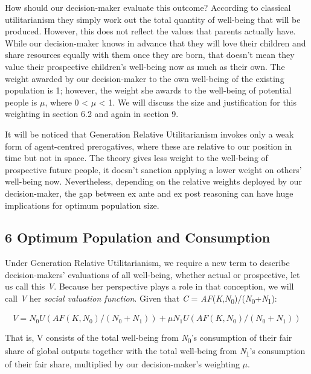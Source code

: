 \documentclass[man,11pt,a4paper,floatsintext]{apa7}
\begin{document}
How should our decision-maker evaluate this outcome? According to classical utilitarianism they simply work out the total quantity of well-being that will be produced. However, this does not reflect the values that parents actually have. While our decision-maker knows in advance that they will love their children and share resources equally with them once they are born, that doesn't mean they value their prospective children's well-being now as much as their own. The weight awarded by our decision-maker to the own well-being of the existing population is 1; however, the weight she awards to the well-being of potential people is $\mu$, where 0 \textless{} $\mu$ \textless{} 1. We will discuss the size and justification for this weighting in section 6.2 and again in section 9.

It will be noticed that Generation Relative Utilitarianism invokes only a weak form of agent-centred prerogatives, where these are relative to our position in time but not in space. The theory gives less weight to the well-being of prospective future people, it doesn't sanction applying a lower weight on others' well-being now. Nevertheless, depending on the relative weights deployed by our decision-maker, the gap between ex ante and ex post reasoning can have huge implications for optimum population size.

\subsection{6 Optimum Population and Consumption}

Under Generation Relative Utilitarianism, we require a new term to describe decision-makers' evaluations of all well-being, whether actual or prospective, let us call this \textit{V}. Because her perspective plays a role in that conception, we will call \textit{V} her \textit{social valuation function}. Given that \textit{C} = \textit{AF}(\textit{K},\textit{N}\textsubscript{0})/(\textit{N}\textsubscript{0}+\textit{N}\textsubscript{1}):

\begin{equation}
V = N_0U(AF(K,N_0)/(N_0+N_1)) + \mu N_1U(AF(K,N_0)/(N_0+N_1))
\tag{2}
\end{equation}

\noindent That is, V consists of the total well-being from \textit{N}\textsubscript{0}'s consumption of their fair share of global outputs together with the total well-being from \textit{N}\textsubscript{1}'s consumption of their fair share, multiplied by our decision-maker's weighting $\mu$.
\end{document}
